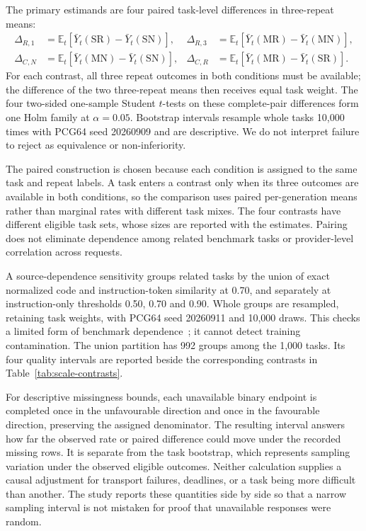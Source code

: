 The primary estimands are four paired task-level differences in three-repeat means:
\begin{align}
\Delta_{R,1}&=\mathbb{E}_t[\bar Y_t(\mathrm{SR})-\bar Y_t(\mathrm{SN})], &
\Delta_{R,3}&=\mathbb{E}_t[\bar Y_t(\mathrm{MR})-\bar Y_t(\mathrm{MN})],\\
\Delta_{C,N}&=\mathbb{E}_t[\bar Y_t(\mathrm{MN})-\bar Y_t(\mathrm{SN})], &
\Delta_{C,R}&=\mathbb{E}_t[\bar Y_t(\mathrm{MR})-\bar Y_t(\mathrm{SR})].
\end{align}
For each contrast, all three repeat outcomes in both conditions must be available; the difference of the two three-repeat means then receives equal task weight. The four two-sided one-sample Student $t$-tests on these complete-pair differences form one Holm family at $\alpha=0.05$. Bootstrap intervals resample whole tasks 10,000 times with PCG64 seed 20260909 and are descriptive. We do not interpret failure to reject as equivalence or non-inferiority.

The paired construction is chosen because each condition is assigned to the same task and repeat labels. A task enters a contrast only when its three outcomes are available in both conditions, so the comparison uses paired per-generation means rather than marginal rates with different task mixes. The four contrasts have different eligible task sets, whose sizes are reported with the estimates. Pairing does not eliminate dependence among related benchmark tasks or provider-level correlation across requests.

A source-dependence sensitivity groups related tasks by the union of exact normalized code and instruction-token similarity at 0.70, and separately at instruction-only thresholds 0.50, 0.70 and 0.90. Whole groups are resampled, retaining task weights, with PCG64 seed 20260911 and 10,000 draws. This checks a limited form of benchmark dependence~\cite{allamanis2019duplication,mackinnon2023clusters}; it cannot detect training contamination. The union partition has 992 groups among the 1,000 tasks. Its four quality intervals are reported beside the corresponding contrasts in Table~\ref{tab:scale-contrasts}.

For descriptive missingness bounds, each unavailable binary endpoint is completed once in the unfavourable direction and once in the favourable direction, preserving the assigned denominator. The resulting interval answers how far the observed rate or paired difference could move under the recorded missing rows. It is separate from the task bootstrap, which represents sampling variation under the observed eligible outcomes. Neither calculation supplies a causal adjustment for transport failures, deadlines, or a task being more difficult than another. The study reports these quantities side by side so that a narrow sampling interval is not mistaken for proof that unavailable responses were random.


